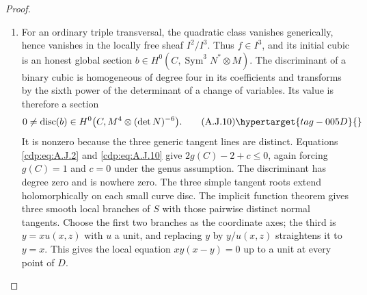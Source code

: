 \begin{proof}
\begin{enumerate}[label={$\langle1\rangle$\arabic*.},leftmargin=*]
\item For an ordinary triple transversal, the quadratic class
vanishes generically, hence vanishes in the locally free
sheaf $I^2/I^3$. Thus $f\in I^3$, and its initial cubic
is an honest global section
$b\in H^0(C,\operatorname{Sym}^3N^*\otimes M)$.
The discriminant of a binary cubic is homogeneous of degree
four in its coefficients and transforms by the sixth power
of the determinant of a change of variables. Its value is
therefore a section
\[
 0\ne\operatorname{disc}(b)\in
 H^0\bigl(C,M^4\otimes(\det N)^{-6}\bigr).
                                                        \tag{A.J.10}\hypertarget{tag-005D}{}\label{cdp:eq:A.J.10}
\]
It is nonzero because the three generic tangent lines are
distinct. Equations \eqref{cdp:eq:A.J.2} and \eqref{cdp:eq:A.J.10} give
$2g(C)-2+c\leq0$, again forcing $g(C)=1$ and $c=0$
under the genus assumption. The discriminant has degree
zero and is nowhere zero. The three simple tangent roots
extend holomorphically on each small curve disc. The implicit
function theorem gives three smooth local branches of $S$
with those pairwise distinct normal tangents. Choose the
first two branches as the coordinate axes; the third is
$y=xu(x,z)$ with $u$ a unit, and replacing $y$ by $y/u(x,z)$
straightens it to $y=x$. This gives the local equation
$xy(x-y)=0$ up to a unit at every point of $D$.

\end{enumerate}
\end{proof}
